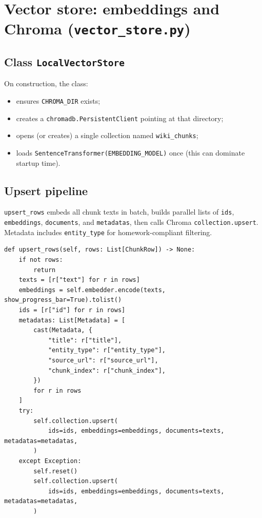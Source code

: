 \documentclass[11pt,a4paper]{article}
\begin{document}
\section{Vector store: embeddings and Chroma (\texttt{vector\_store.py})}

\subsection{Class \texttt{LocalVectorStore}}
On construction, the class:
\begin{itemize}[leftmargin=*]
  \item ensures \texttt{CHROMA\_DIR} exists;
  \item creates a \texttt{chromadb.PersistentClient} pointing at that directory;
  \item opens (or creates) a single collection named \texttt{wiki\_chunks};
  \item loads \texttt{SentenceTransformer(EMBEDDING\_MODEL)} once (this can dominate startup time).
\end{itemize}

\subsection{Upsert pipeline}
\texttt{upsert\_rows} embeds all chunk texts in batch, builds parallel lists of \texttt{ids},
\texttt{embeddings}, \texttt{documents}, and \texttt{metadatas}, then calls Chroma
\texttt{collection.upsert}. Metadata includes \texttt{entity\_type} for homework-compliant filtering.

\begin{lstlisting}[caption={Embedding batch and upsert (\texttt{vector\_store.py}, excerpt).},label={lst:upsert}]
def upsert_rows(self, rows: List[ChunkRow]) -> None:
    if not rows:
        return
    texts = [r["text"] for r in rows]
    embeddings = self.embedder.encode(texts, show_progress_bar=True).tolist()
    ids = [r["id"] for r in rows]
    metadatas: List[Metadata] = [
        cast(Metadata, {
            "title": r["title"],
            "entity_type": r["entity_type"],
            "source_url": r["source_url"],
            "chunk_index": r["chunk_index"],
        })
        for r in rows
    ]
    try:
        self.collection.upsert(
            ids=ids, embeddings=embeddings, documents=texts, metadatas=metadatas,
        )
    except Exception:
        self.reset()
        self.collection.upsert(
            ids=ids, embeddings=embeddings, documents=texts, metadatas=metadatas,
        )
\end{lstlisting}
\end{document}
